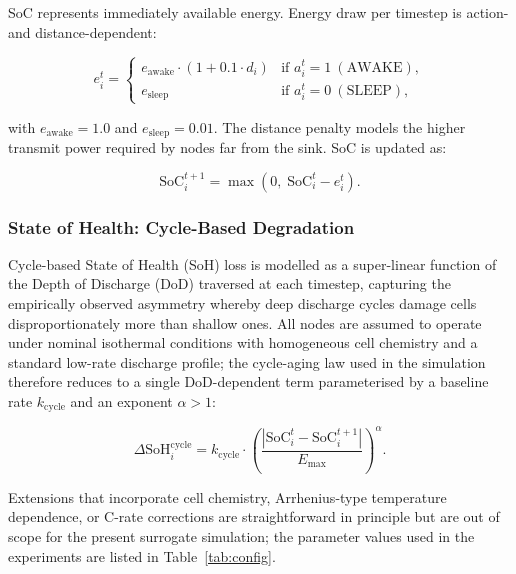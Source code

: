 \documentclass[journal]{IEEEtran}
\begin{document}
SoC represents immediately available energy. Energy draw per timestep
is action- and distance-dependent:

\begin{equation}
  e_i^t =
  \begin{cases}
    e_{\text{awake}} \cdot (1 + 0.1 \cdot d_i) &
      \text{if } a_i^t = 1\ (\text{AWAKE}), \\
    e_{\text{sleep}} &
      \text{if } a_i^t = 0\ (\text{SLEEP}),
  \end{cases}
  \label{eq:energy_draw}
\end{equation}

with $e_{\text{awake}} = 1.0$ and $e_{\text{sleep}} = 0.01$. The
distance penalty models the higher transmit power required by nodes far
from the sink. SoC is updated as:

\begin{equation}
  \text{SoC}_i^{t+1} = \max\!\left(0,\;
  \text{SoC}_i^t - e_i^t\right).
  \label{eq:soc_update}
\end{equation}

\subsubsection{State of Health: Cycle-Based Degradation}

Cycle-based State of Health (SoH) loss is modelled as a super-linear
function of the Depth of Discharge (DoD) traversed at each timestep,
capturing the empirically observed asymmetry whereby deep discharge
cycles damage cells disproportionately more than shallow ones. All
nodes are assumed to operate under nominal isothermal conditions with
homogeneous cell chemistry and a standard low-rate discharge profile;
the cycle-aging law used in the simulation therefore reduces to a
single DoD-dependent term parameterised by a baseline rate
$k_{\text{cycle}}$ and an exponent $\alpha > 1$:

\begin{equation}
  \Delta\text{SoH}_i^{\text{cycle}} = k_{\text{cycle}} \cdot
  \left( \frac{|\text{SoC}_i^t - \text{SoC}_i^{t+1}|}{E_{\max}}
  \right)^{\!\alpha}.
\label{eq:soh_cycle}
\end{equation}

Extensions that incorporate cell chemistry, Arrhenius-type
temperature dependence, or C-rate corrections are straightforward
in principle but are out of scope for the present surrogate
simulation; the parameter values used in the experiments are listed
in Table~\ref{tab:config}.
\end{document}
